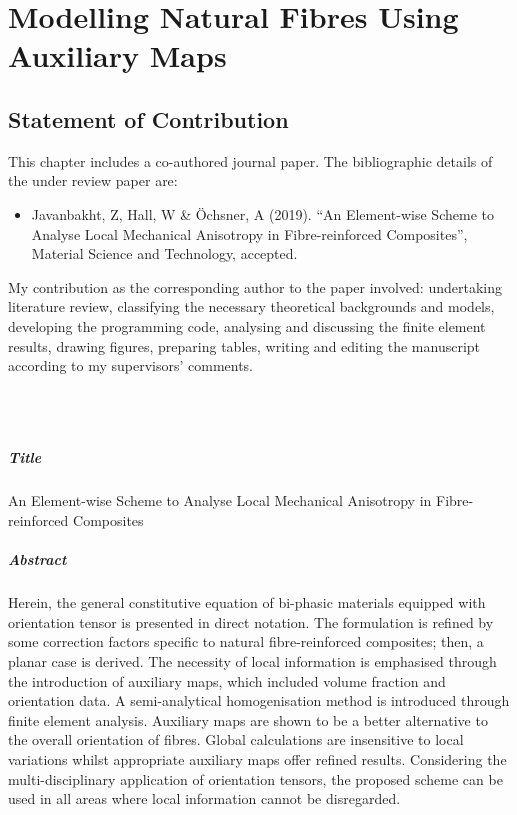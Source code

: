 \chapter{Modelling Natural Fibres Using Auxiliary Maps} \label{chap:p7}
\section*{Statement of Contribution}
	This chapter includes a co-authored journal paper. The bibliographic details of the under review paper are:
\begin{itemize}
	\item Javanbakht, Z, Hall, W \& Öchsner, A (2019). “An Element-wise Scheme to Analyse Local Mechanical Anisotropy in Fibre-reinforced Composites”, Material Science and Technology, accepted.
\end{itemize}
	My contribution as the corresponding author to the paper involved: undertaking literature review, classifying the necessary theoretical backgrounds and models, developing the programming code, analysing and discussing the finite element results, drawing figures, preparing tables, writing and editing the manuscript according to my supervisors’ comments.

\Zia\\
\Wayne\\
\vfill
\newpage

\paragraph{Title} An Element-wise Scheme to Analyse Local Mechanical Anisotropy in Fibre-reinforced Composites
    
 
    
\paragraph{Abstract} Herein, the general constitutive equation of bi-phasic materials equipped with orientation tensor is presented in direct notation. The formulation is refined by some correction factors specific to natural fibre-reinforced composites; then, a planar case is derived. The necessity of local information is emphasised through the introduction of auxiliary maps, which included volume fraction and orientation data. A semi-analytical homogenisation method is introduced through finite element analysis. Auxiliary maps are shown to be a better alternative to the overall orientation of fibres. Global calculations are insensitive to local variations whilst appropriate auxiliary maps offer refined results. Considering the multi-disciplinary application of orientation tensors, the proposed scheme can be used in all areas where local information cannot be disregarded.


